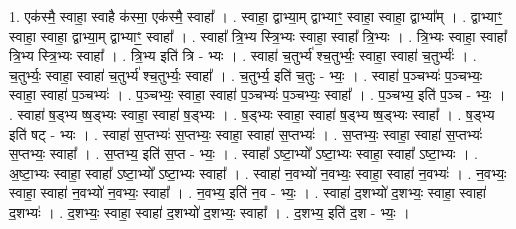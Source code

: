 \documentclass[17pt]{extarticle}
\begin{document}
1. एक॑स्मै॒ स्वाहा॒ स्वाहै क॑स्मा॒ एक॑स्मै॒ स्वाहा᳚ । . स्वाहा॒ द्वाभ्या॒म् द्वाभ्याꣳ॒॒ स्वाहा॒ स्वाहा॒ द्वाभ्या᳚म् । . द्वाभ्याꣳ॒॒ स्वाहा॒ स्वाहा॒ द्वाभ्या॒म् द्वाभ्याꣳ॒॒ स्वाहा᳚ । . स्वाहा᳚ त्रि॒भ्य स्त्रि॒भ्यः स्वाहा॒ स्वाहा᳚ त्रि॒भ्यः । . त्रि॒भ्यः स्वाहा॒ स्वाहा᳚ त्रि॒भ्य स्त्रि॒भ्यः स्वाहा᳚ । . त्रि॒भ्य इति॑ त्रि - भ्यः । . स्वाहा॑ च॒तुर्भ्य॑ श्च॒तुर्भ्यः॒ स्वाहा॒ स्वाहा॑ च॒तुर्भ्यः॑ । . च॒तुर्भ्यः॒ स्वाहा॒ स्वाहा॑ च॒तुर्भ्य॑ श्च॒तुर्भ्यः॒ स्वाहा᳚ । . च॒तुर्भ्य॒ इति॑ च॒तुः - भ्यः॒ । . स्वाहा॑ प॒ञ्चभ्यः॑ प॒ञ्चभ्यः॒ स्वाहा॒ स्वाहा॑ प॒ञ्चभ्यः॑ । . प॒ञ्चभ्यः॒ स्वाहा॒ स्वाहा॑ प॒ञ्चभ्यः॑ प॒ञ्चभ्यः॒ स्वाहा᳚ । . प॒ञ्चभ्य॒ इति॑ प॒ञ्च - भ्यः॒ । . स्वाहा॑ ष॒ड्भ्य ष्ष॒ड्भ्यः स्वाहा॒ स्वाहा॑ ष॒ड्भ्यः । . ष॒ड्भ्यः स्वाहा॒ स्वाहा॑ ष॒ड्भ्य ष्ष॒ड्भ्यः स्वाहा᳚ । . ष॒ड्भ्य इति॑ षट् - भ्यः । . स्वाहा॑ स॒प्तभ्यः॑ स॒प्तभ्यः॒ स्वाहा॒ स्वाहा॑ स॒प्तभ्यः॑ । . स॒प्तभ्यः॒ स्वाहा॒ स्वाहा॑ स॒प्तभ्यः॑ स॒प्तभ्यः॒ स्वाहा᳚ । . स॒प्तभ्य॒ इति॑ स॒प्त - भ्यः॒ । . स्वाहा᳚ ऽष्टा॒भ्यो᳚ ऽष्टा॒भ्यः स्वाहा॒ स्वाहा᳚ ऽष्टा॒भ्यः । . अ॒ष्टा॒भ्यः स्वाहा॒ स्वाहा᳚ ऽष्टा॒भ्यो᳚ ऽष्टा॒भ्यः स्वाहा᳚ । . स्वाहा॑ न॒वभ्यो॑ न॒वभ्यः॒ स्वाहा॒ स्वाहा॑ न॒वभ्यः॑ । . न॒वभ्यः॒ स्वाहा॒ स्वाहा॑ न॒वभ्यो॑ न॒वभ्यः॒ स्वाहा᳚ । . न॒वभ्य॒ इति॑ न॒व - भ्यः॒ । . स्वाहा॑ द॒शभ्यो॑ द॒शभ्यः॒ स्वाहा॒ स्वाहा॑ द॒शभ्यः॑ । . द॒शभ्यः॒ स्वाहा॒ स्वाहा॑ द॒शभ्यो॑ द॒शभ्यः॒ स्वाहा᳚ । . द॒शभ्य॒ इति॑ द॒श - भ्यः॒ । \newline
\end{document}
